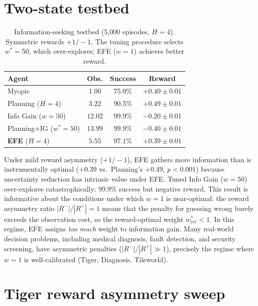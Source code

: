 \documentclass[runningheads]{llncs}
\begin{document}
\section{Two-state testbed}
\label{app:testbed}

\begin{table}[h]
\centering
\caption{Information-seeking testbed (5{,}000 episodes, $H{=}4$). Symmetric rewards $+1 / {-}1$. The tuning procedure selects $w^*{=}50$, which over-explores; EFE ($w{=}1$) achieves better reward.}
\begin{small}
\begin{tabular}{lccc}
\toprule
Agent & Obs. & Success & Reward \\
\midrule
Myopic & $1.00$ & 75.0\% & $+0.40 \pm 0.01$ \\
Planning ($H{=}4$) & $3.22$ & 90.5\% & $\mathbf{+0.49 \pm 0.01}$ \\
Info Gain ($w{=}50$) & $12.02$ & 99.9\% & $-0.20 \pm 0.01$ \\
Planning+IG ($w^*{=}50$) & $13.99$ & 99.9\% & $-0.40 \pm 0.01$ \\
\textbf{EFE} ($H{=}4$) & $5.55$ & $\mathbf{97.1\%}$ & $+0.39 \pm 0.01$ \\
\bottomrule
\end{tabular}
\end{small}
\end{table}

Under mild reward asymmetry ($+1 / {-}1$), EFE gathers more information than is instrumentally optimal ($+0.39$ vs.\ Planning's $+0.49$, $p < 0.001$) because uncertainty reduction has intrinsic value under EFE. Tuned Info Gain ($w{=}50$) over-explores catastrophically: 99.9\% success but negative reward. This result is informative about the conditions under which $w{=}1$ is near-optimal: the reward asymmetry ratio $|R^-|/|R^+| = 1$ means that the penalty for guessing wrong barely exceeds the observation cost, so the reward-optimal weight $w^*_{\text{ret}} < 1$. In this regime, EFE assigns \emph{too much} weight to information gain. Many real-world decision problems, including medical diagnosis, fault detection, and security screening, have asymmetric penalties ($|R^-|/|R^+| \gg 1$), precisely the regime where $w{=}1$ is well-calibrated (Tiger, Diagnosis, Tileworld).

\section{Tiger reward asymmetry sweep}
\label{app:tiger_sweep}
\end{document}
